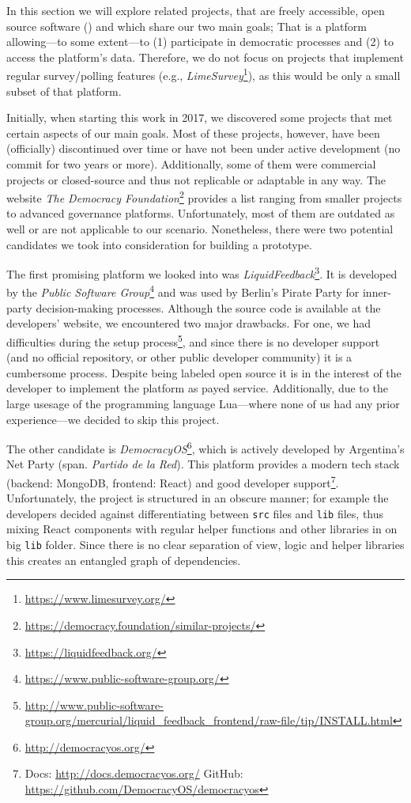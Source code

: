 In this section we will explore related projects, that are freely accessible, open source software () and which share our two main goals; That is a platform allowing---to some extent---to (1) participate in democratic processes and (2) to access the platform’s data. Therefore, we do not focus on projects that implement regular survey/polling features (e.g., \textit{LimeSurvey}\footnote{\url{https://www.limesurvey.org/}}), as this would be only a small subset of that platform.

Initially, when starting this work in 2017, we discovered some projects that met certain aspects of our main goals. Most of these projects, however, have been (officially) discontinued over time or have not been under active development (no commit for two years or more). Additionally, some of them were commercial projects or closed-source and thus not replicable or adaptable in any way. The website \textit{The Democracy Foundation}\footnote{\url{https://democracy.foundation/similar-projects/}} provides a list ranging from smaller projects to advanced governance platforms. Unfortunately, most of them are outdated as well or are not applicable to our scenario. Nonetheless, there were two potential candidates we took into consideration for building a prototype.

The first promising platform we looked into was \textit{LiquidFeedback}\footnote{\url{https://liquidfeedback.org/}}. It is developed by the \textit{Public Software Group}\footnote{\url{https://www.public-software-group.org/}} and was used by Berlin’s Pirate Party for inner-party decision-making processes. Although the source code is available at the developers’ website, we encountered two major drawbacks. For one, we had difficulties during the setup process\footnote{\url{http://www.public-software-group.org/mercurial/liquid_feedback_frontend/raw-file/tip/INSTALL.html}}, and since there is no developer support (and no official repository, or other public developer community) it is a cumbersome process. Despite being labeled open source it is in the interest of the developer to implement the platform as payed service. Additionally, due to the large usesage of the programming language Lua---where none of us had any prior experience---we decided to skip this project.

The other candidate is \textit{DemocracyOS}\footnote{\url{http://democracyos.org/}}, which is actively developed by Argentina’s Net Party (span. \textit{Partido de la Red}). This platform provides a modern tech stack (backend: MongoDB, frontend: React) and good developer support\footnote{Docs: \url{http://docs.democracyos.org/} GitHub: \url{https://github.com/DemocracyOS/democracyos}}. Unfortunately, the project is structured in an obscure manner; for example the developers decided against differentiating between \texttt{src} files and \texttt{lib} files, thus mixing React components with regular helper functions and other libraries in on big \texttt{lib} folder. Since there is no clear separation of view, logic and helper libraries this creates an entangled graph of dependencies.

